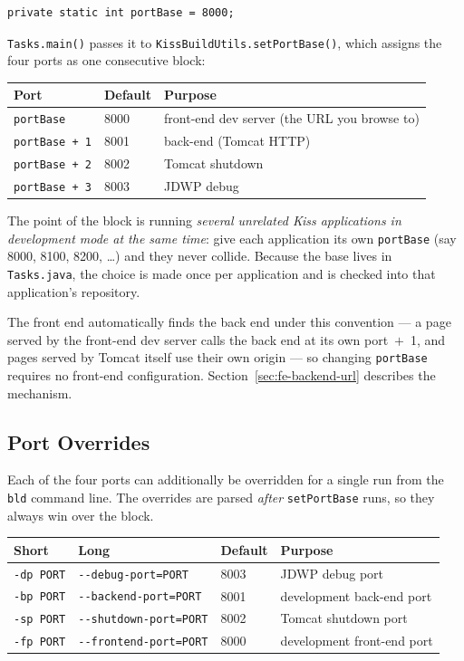 \begin{lstlisting}[style=java]
private static int portBase = 8000;
\end{lstlisting}

\noindent
\texttt{Tasks.main()} passes it to \texttt{KissBuildUtils.setPortBase()}, which assigns the four ports as one consecutive block:

\begin{longtable}{P{3.0cm}P{2.0cm}P{5.0cm}}
\toprule
\textbf{Port} & \textbf{Default} & \textbf{Purpose} \\
\midrule
\endhead
\texttt{portBase}     & 8000 & front-end dev server (the URL you browse to) \\
\texttt{portBase + 1} & 8001 & back-end (Tomcat HTTP) \\
\texttt{portBase + 2} & 8002 & Tomcat shutdown \\
\texttt{portBase + 3} & 8003 & JDWP debug \\
\bottomrule
\end{longtable}

\noindent
The point of the block is running \emph{several unrelated Kiss applications in development mode at the same time}: give each application its own \texttt{portBase} (say 8000, 8100, 8200, \ldots) and they never collide.  Because the base lives in \texttt{Tasks.java}, the choice is made once per application and is checked into that application's repository.

The front end automatically finds the back end under this convention --- a page served by the front-end dev server calls the back end at its own port~$+$~1, and pages served by Tomcat itself use their own origin --- so changing \texttt{portBase} requires no front-end configuration.  Section~\ref{sec:fe-backend-url} describes the mechanism.

\subsection{Port Overrides}

Each of the four ports can additionally be overridden for a single run from the \texttt{bld} command line.  The overrides are parsed \emph{after} \texttt{setPortBase} runs, so they always win over the block.

\begin{longtable}{P{1.7cm}P{4.2cm}P{1.4cm}P{2.2cm}}
\toprule
\textbf{Short} & \textbf{Long} & \textbf{Default} & \textbf{Purpose} \\
\midrule
\endhead
\texttt{-dp PORT} & \texttt{-{}-debug-port=PORT}    & 8003 & JDWP debug port \\
\texttt{-bp PORT} & \texttt{-{}-backend-port=PORT}  & 8001 & development back-end port \\
\texttt{-sp PORT} & \texttt{-{}-shutdown-port=PORT} & 8002 & Tomcat shutdown port \\
\texttt{-fp PORT} & \texttt{-{}-frontend-port=PORT} & 8000 & development front-end port \\
\bottomrule
\end{longtable}

